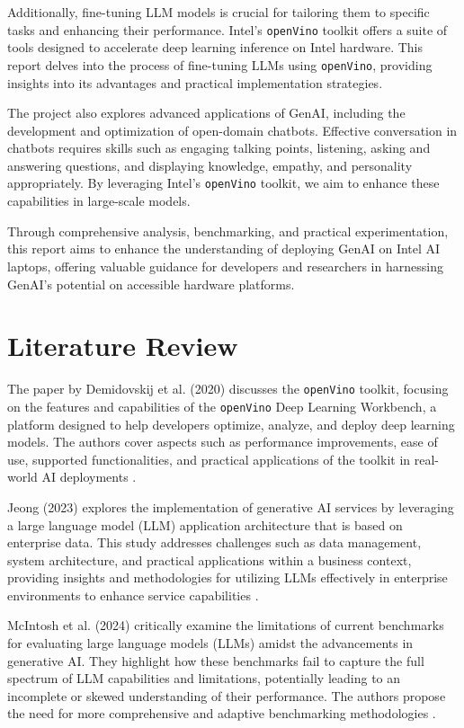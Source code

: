 \documentclass{josis}
\begin{document}
Additionally, fine-tuning LLM models is crucial for tailoring them to specific tasks and enhancing their performance. Intel's \texttt{openVino} toolkit offers a suite of tools designed to accelerate deep learning inference on Intel hardware. This report delves into the process of fine-tuning LLMs using \texttt{openVino}, providing insights into its advantages and practical implementation strategies.

The project also explores advanced applications of GenAI, including the development and optimization of open-domain chatbots. Effective conversation in chatbots requires skills such as engaging talking points, listening, asking and answering questions, and displaying knowledge, empathy, and personality appropriately. By leveraging Intel's \texttt{openVino} toolkit, we aim to enhance these capabilities in large-scale models.

Through comprehensive analysis, benchmarking, and practical experimentation, this report aims to enhance the understanding of deploying GenAI on Intel AI laptops, offering valuable guidance for developers and researchers in harnessing GenAI's potential on accessible hardware platforms.
\section{Literature Review}
The paper by Demidovskij et al. (2020) discusses the \texttt{openVino} toolkit, focusing on the features and capabilities of the \texttt{openVino} Deep Learning Workbench, a platform designed to help developers optimize, analyze, and deploy deep learning models. The authors cover aspects such as performance improvements, ease of use, supported functionalities, and practical applications of the toolkit in real-world AI deployments \cite{Demidovskij2020}.

Jeong (2023) explores the implementation of generative AI services by leveraging a large language model (LLM) application architecture that is based on enterprise data. This study addresses challenges such as data management, system architecture, and practical applications within a business context, providing insights and methodologies for utilizing LLMs effectively in enterprise environments to enhance service capabilities \cite{Jeong2023}.

McIntosh et al. (2024) critically examine the limitations of current benchmarks for evaluating large language models (LLMs) amidst the advancements in generative AI. They highlight how these benchmarks fail to capture the full spectrum of LLM capabilities and limitations, potentially leading to an incomplete or skewed understanding of their performance. The authors propose the need for more comprehensive and adaptive benchmarking methodologies \cite{McIntosh2024}.
\end{document}
